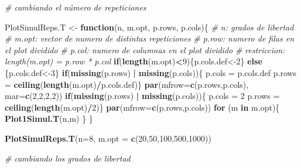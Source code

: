 \documentclass[]{article}
\newenvironment{Shaded}{\begin{snugshade}}{\end{snugshade}}
\newcommand{\CommentTok}[1]{\textcolor[rgb]{0.56,0.35,0.01}{\textit{#1}}}
\newcommand{\ControlFlowTok}[1]{\textcolor[rgb]{0.13,0.29,0.53}{\textbf{#1}}}
\newcommand{\DataTypeTok}[1]{\textcolor[rgb]{0.13,0.29,0.53}{#1}}
\newcommand{\DecValTok}[1]{\textcolor[rgb]{0.00,0.00,0.81}{#1}}
\newcommand{\KeywordTok}[1]{\textcolor[rgb]{0.13,0.29,0.53}{\textbf{#1}}}
\newcommand{\NormalTok}[1]{#1}
\newcommand{\OperatorTok}[1]{\textcolor[rgb]{0.81,0.36,0.00}{\textbf{#1}}}
\newcommand{\StringTok}[1]{\textcolor[rgb]{0.31,0.60,0.02}{#1}}
\begin{document}
\begin{Shaded}
\begin{Highlighting}[]
\CommentTok{# cambiando el número de repeticiones}

\NormalTok{PlotSimulReps.T <-}\StringTok{ }\ControlFlowTok{function}\NormalTok{(n, m.opt, p.rows, p.cols)\{}
  \CommentTok{# n: grados de libertad }
  \CommentTok{# m.opt: vector de numero de distintas repeticiones}
  \CommentTok{# p.row: numero de filas en el plot dividido}
  \CommentTok{# p.col: numero de columnas en el plot dividido}
  \CommentTok{# restriccion: length(m.opt) = p.row * p.col}
  \ControlFlowTok{if}\NormalTok{(}\KeywordTok{length}\NormalTok{(m.opt)}\OperatorTok{<}\DecValTok{9}\NormalTok{)\{p.cols.def<-}\DecValTok{2}\NormalTok{\} }\ControlFlowTok{else}\NormalTok{ \{p.cols.def<-}\DecValTok{3}\NormalTok{\}}
  \ControlFlowTok{if}\NormalTok{(}\KeywordTok{missing}\NormalTok{(p.rows) }\OperatorTok{|}\StringTok{ }\KeywordTok{missing}\NormalTok{(p.cols))\{}
\NormalTok{    p.cols =}\StringTok{ }\NormalTok{p.cols.def}
\NormalTok{    p.rows =}\StringTok{ }\KeywordTok{ceiling}\NormalTok{(}\KeywordTok{length}\NormalTok{(m.opt)}\OperatorTok{/}\NormalTok{p.cols.def)\}}
  \KeywordTok{par}\NormalTok{(}\DataTypeTok{mfrow=}\KeywordTok{c}\NormalTok{(p.rows,p.cols), }\DataTypeTok{mar=}\KeywordTok{c}\NormalTok{(}\DecValTok{2}\NormalTok{,}\DecValTok{2}\NormalTok{,}\DecValTok{2}\NormalTok{,}\DecValTok{2}\NormalTok{))}
  \ControlFlowTok{if}\NormalTok{(}\KeywordTok{missing}\NormalTok{(p.rows) }\OperatorTok{|}\StringTok{ }\KeywordTok{missing}\NormalTok{(p.cols))\{}
\NormalTok{   p.cols =}\StringTok{ }\DecValTok{2}
\NormalTok{   p.rows =}\StringTok{ }\KeywordTok{ceiling}\NormalTok{(}\KeywordTok{length}\NormalTok{(m.opt)}\OperatorTok{/}\DecValTok{2}\NormalTok{)\}}
  \KeywordTok{par}\NormalTok{(}\DataTypeTok{mfrow=}\KeywordTok{c}\NormalTok{(p.rows,p.cols))}
  \ControlFlowTok{for}\NormalTok{ (m }\ControlFlowTok{in}\NormalTok{ m.opt)\{}
    \KeywordTok{Plot1Simul.T}\NormalTok{(n,m)}
\NormalTok{  \}}
\NormalTok{\}}

\KeywordTok{PlotSimulReps.T}\NormalTok{(}\DataTypeTok{n=}\DecValTok{8}\NormalTok{, }\DataTypeTok{m.opt =} \KeywordTok{c}\NormalTok{(}\DecValTok{20}\NormalTok{,}\DecValTok{50}\NormalTok{,}\DecValTok{100}\NormalTok{,}\DecValTok{500}\NormalTok{,}\DecValTok{1000}\NormalTok{))}
  
\CommentTok{# cambiando los grados de libertad}


\end{Highlighting}
\end{Shaded}
\end{document}
